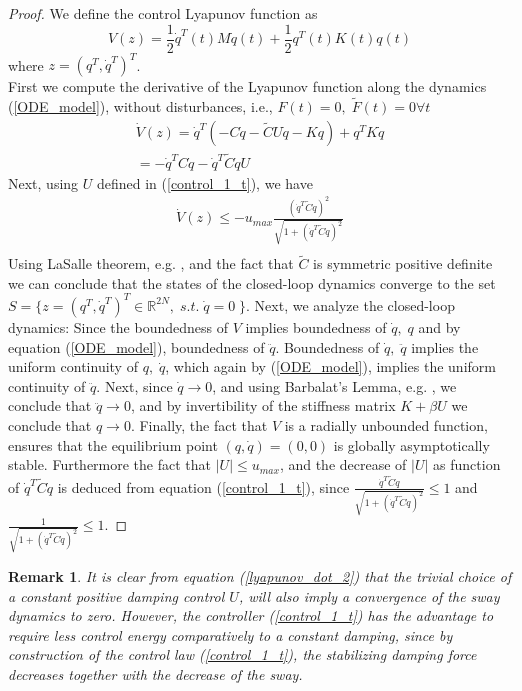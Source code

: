 \documentclass[letterpaper, 11 pt, conference]{ieeeconf}
\newtheorem{remark}{Remark}
\begin{document}
\begin{proof}
 We define the control Lyapunov function  as
\begin{equation}\label{lyapunov1-t}
V(z)=\frac{1}{2}\dot{q}^{T}(t)M\dot{q}(t)+\frac{1}{2}q^{T}(t)K(t)q(t)
\end{equation}
where $z=(q^{T},\dot{q}^{T})^{T}$.\\
 First we compute the derivative of the Lyapunov function
along the dynamics  (\ref{ODE_model}), without disturbances, i.e.,
$F(t)=0,\;\tilde{F}(t)=0 \forall t$
\begin{equation}\label{lyapunov_dot_2}
\begin{array}{l}
\dot{V}(z)=\dot{q}^{T}(-C\dot{q}-\tilde{C}U\dot{q}-Kq)+q^{T}K\dot{q}\\
\hspace{0cm}=-\dot{q}^{T}C\dot{q}-\dot{q}^{T}\tilde{C}\dot{q} U
\end{array}
\end{equation}
Next, using $U$ defined in (\ref{control_1_t}), we have
\begin{equation}\label{lyapunov_dot_4}
\begin{array}{l}
\dot{V}(z)\leq -u_{max}\frac{(\dot{q}^{T}\tilde{C}\dot{q})^{2}
}{\sqrt{1+(\dot{q}^{T}\tilde{C}\dot{q})^{2}}}\\
\end{array}
\end{equation}
Using LaSalle theorem, e.g. \cite{K96}, and the fact that
$\tilde{C}$ is symmetric positive definite we can conclude that
the states of the closed-loop dynamics converge to the set
$S=\{z=(q^{T},\dot{q}^{T})^{T}\in\mathbb{R}^{2N},\;s.t.\;\dot{q}=0\;\}$.
Next, we analyze the closed-loop dynamics: Since the boundedness
of $V$ implies boundedness of $\dot{q},\;q$ and by equation
(\ref{ODE_model}), boundedness of $\ddot{q}$. Boundedness of
$\dot{q},\;\ddot{q}$ implies the uniform continuity of
$q,\;\dot{q}$, which again by (\ref{ODE_model}), implies the
uniform continuity of $\ddot{q}$. Next, since $\dot{q}\rightarrow
0$, and using Barbalat's Lemma, e.g. \cite{K96}, we conclude that
$\ddot{q}\rightarrow 0$, and by invertibility of the stiffness
matrix $K+\beta U$ we conclude that $q\rightarrow 0$. Finally, the
fact that $V$ is a radially unbounded function, ensures that the
equilibrium point $(q,\dot q)=(0,0)$ is globally asymptotically
stable. Furthermore the fact that $|U|\leq u_{max}$, and the
decrease of $|U|$ as function of $\dot{q}^{T}\tilde{C} \dot{q}$ is
deduced from equation (\ref{control_1_t}), since
$\frac{\dot{q}^{T}\tilde{C}\dot{q}
}{\sqrt{1+(\dot{q}^{T}\tilde{C}\dot{q})^{2}}}\leq 1$ and
$\frac{1}{\sqrt{1+(\dot{q}^{T}\tilde{C}\dot{q})^{2}}}\leq 1$.
\end{proof}
\begin{remark}
It is clear from equation (\ref{lyapunov_dot_2}) that the trivial
choice of a constant positive damping control $U$, will also imply
a convergence of the sway dynamics to zero. However, the
controller (\ref{control_1_t}) has the advantage to  require less
control energy comparatively to a constant damping, since by
construction of the control law (\ref{control_1_t}), the
stabilizing damping force decreases together with the decrease of
the sway.
\end{remark}
\end{document}
